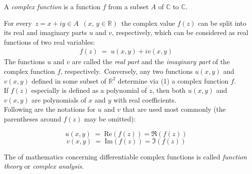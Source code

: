 \documentclass[12pt]{article}
\begin{document}
A {\em complex function} is a function $f$ from a subset $A$ of 
$\mathbb{C}$ to $\mathbb{C}$.

For every\, $z = x+iy\in A\,\,\,(x,\,y \in \mathbb{R})$\, the 
complex value $f(z)$ can be split into its real and imaginary 
parts $u$ and $v$, respectively, which can be considered as 
real functions of two real variables:
\begin{align}
f(z) \;=\; u(x,y)+iv(x,y)
\end{align}
The functions $u$ and $v$ are called the {\em real part} and 
the {\em imaginary part} of the complex function $f$, 
respectively.\, Conversely, any two functions $u(x,y)$ and 
$v(x,y)$ defined in some subset of $\mathbb{R}^2$ determine via 
(1) a complex function $f$.\\

If $f(z)$ especially is defined as a polynomial 
of $z$, then both $u(x,y)$ and $v(x,y)$ are polynomials of $x$ and 
$y$ with real coefficients.\\

Following are the notations for $u$ and $v$ that
are used most commonly (the parentheses around $f(z)$ may be 
omitted):

$$u(x,y) \;=\; \mbox{Re}\left(f(z)\right) = \Re\left(f(z)\right)$$
$$v(x,y) \;=\; \mbox{Im}\left(f(z)\right) = \Im\left(f(z)\right)$$

The  of mathematics concerning differentiable complex functions is called {\em function theory} or {\em complex analysis}.
\end{document}
